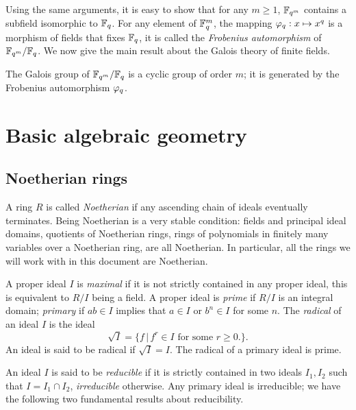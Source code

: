 Using the same arguments, it is easy to show that for any $m\ge 1$,
$\mathbb{F}_{q^m}$ contains a subfield isomorphic to $\mathbb{F}_q$.  For any element
of $\mathbb{F}_q^m$, the mapping $\varphi_q:x\mapsto
x^q$ is a
morphism of fields that fixes $\mathbb{F}_q$, it is called the
\textit{Frobenius automorphism} of
$\mathbb{F}_{q^m}/\mathbb{F}_q$. We now give the main result about the Galois theory
of finite fields.

\begin{proposition}
  The Galois group of $\mathbb{F}_{q^m}/\mathbb{F}_q$ is a cyclic group of order $m$;
  it is generated by the Frobenius automorphism $\varphi_q$.
\end{proposition}


\section{Basic algebraic geometry}
\label{sec:basic-algebr-geom}

\subsection{Noetherian rings}
\label{sec:noetherian-rings}
A ring $R$ is called \textit{Noetherian} if any
ascending chain of ideals eventually terminates. Being Noetherian is a
very stable condition: fields and principal ideal domains, quotients
of Noetherian rings, rings of polynomials in finitely many variables
over a Noetherian ring, are all Noetherian. In particular, all the
rings we will work with in this document are Noetherian.

A proper ideal $I$ is \textit{maximal} if it is
not strictly contained in any proper ideal, this is equivalent to
$R/I$ being a field. A proper ideal is
\textit{prime} if $R/I$ is an integral domain;
\textit{primary} if $ab\in I$ implies that $a\in
I$ or $b^n\in I$ for some $n$. The
\textit{radical} of an ideal $I$ is the
ideal
\begin{equation}
  \label{eq:212}
  \sqrt{I} = \{f \,|\, f^r\in I \text{ for some $r\ge0$.}\}
  \text{.}
\end{equation}
An ideal is said to be radical if $\sqrt{I}=I$. The radical of a
primary ideal is prime.

An ideal $I$ is said to be \textit{reducible}
if it is strictly contained in two ideals $I_1,I_2$ such that
$I=I_1\cap I_2$, \textit{irreducible}
otherwise. Any primary ideal is irreducible; we have the following two
fundamental results about reducibility.

